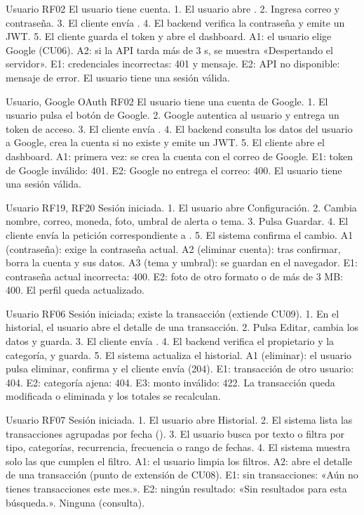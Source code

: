 {Usuario}
{RF02}
{El usuario tiene cuenta.}
{1. El usuario abre . 2. Ingresa correo y contraseña. 3. El cliente envía . 4. El backend verifica la contraseña y emite un JWT. 5. El cliente guarda el token y abre el dashboard.}
{A1: el usuario elige Google (CU06). A2: si la API tarda más de 3 s, se muestra «Despertando el servidor».}
{E1: credenciales incorrectas: 401 y mensaje. E2: API no disponible: mensaje de error.}
{El usuario tiene una sesión válida.}

{Usuario, Google OAuth}
{RF02}
{El usuario tiene una cuenta de Google.}
{1. El usuario pulsa el botón de Google. 2. Google autentica al usuario y entrega un token de acceso. 3. El cliente envía . 4. El backend consulta los datos del usuario a Google, crea la cuenta si no existe y emite un JWT. 5. El cliente abre el dashboard.}
{A1: primera vez: se crea la cuenta con el correo de Google.}
{E1: token de Google inválido: 401. E2: Google no entrega el correo: 400.}
{El usuario tiene una sesión válida.}

{Usuario}
{RF19, RF20}
{Sesión iniciada.}
{1. El usuario abre Configuración. 2. Cambia nombre, correo, moneda, foto, umbral de alerta o tema. 3. Pulsa Guardar. 4. El cliente envía la petición correspondiente a . 5. El sistema confirma el cambio.}
{A1 (contraseña): exige la contraseña actual. A2 (eliminar cuenta): tras confirmar,  borra la cuenta y sus datos. A3 (tema y umbral): se guardan en el navegador.}
{E1: contraseña actual incorrecta: 400. E2: foto de otro formato o de más de 3 MB: 400.}
{El perfil queda actualizado.}

{Usuario}
{RF06}
{Sesión iniciada; existe la transacción (extiende CU09).}
{1. En el historial, el usuario abre el detalle de una transacción. 2. Pulsa Editar, cambia los datos y guarda. 3. El cliente envía . 4. El backend verifica el propietario y la categoría, y guarda. 5. El sistema actualiza el historial.}
{A1 (eliminar): el usuario pulsa eliminar, confirma y el cliente envía  (204).}
{E1: transacción de otro usuario: 404. E2: categoría ajena: 404. E3: monto inválido: 422.}
{La transacción queda modificada o eliminada y los totales se recalculan.}

{Usuario}
{RF07}
{Sesión iniciada.}
{1. El usuario abre Historial. 2. El sistema lista las transacciones agrupadas por fecha (). 3. El usuario busca por texto o filtra por tipo, categorías, recurrencia, frecuencia o rango de fechas. 4. El sistema muestra solo las que cumplen el filtro.}
{A1: el usuario limpia los filtros. A2: abre el detalle de una transacción (punto de extensión de CU08).}
{E1: sin transacciones: «Aún no tienes transacciones este mes.». E2: ningún resultado: «Sin resultados para esta búsqueda.».}
{Ninguna (consulta).}

